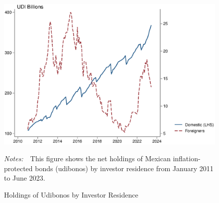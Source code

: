 \documentclass[a4paper, 12pt]{article}
\newcommand{\figtext}[1]{
	\vspace{-1ex}
	\captionsetup{justification=justified,font=footnotesize}
	\caption*{#1}
}
\newcommand{\fignotes}[1]{\figtext{\emph{Notes:~}~#1}}
\providecommand{\lastobsflwbdm}{June 2023}
\begin{document}
\begin{appendices}
	\begin{figure}[!htb]
		\caption{Holdings of Udibonos by Investor Residence} \label{fig:frgvsdomudi}
		\begin{center}
			\begin{minipage}{0.9\linewidth}
				\begin{center}
					\includegraphics[width=1\textwidth,height=.3\textheight]{../Figures/frgvsdomudi} \\
				\end{center}
				\fignotes{This figure shows the net holdings of Mexican inflation-protected bonds (udibonos) by investor residence from January 2011 to \lastobsflwbdm.}
			\end{minipage}
		\end{center}
	\end{figure}
	

\end{appendices}
\end{document}
